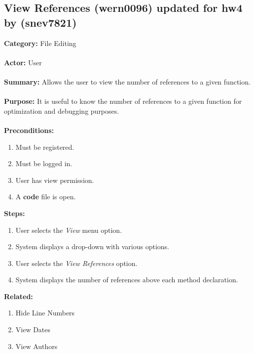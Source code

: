 \documentclass[11pt]{report}
\begin{document}
\subsection{View References (wern0096) updated for hw4 by (snev7821)}
\begin{framed}

	\textbf{Category:} File Editing \\ \\
	\textbf{Actor:} User \\ \\
	\textbf{Summary:} Allows the user to view the number of references to a given function. \\ \\
	\textbf{Purpose:} It is useful to know the number of references to a given function for optimization and debugging purposes. \\ \\
	\textbf{Preconditions:} 
	\begin{enumerate}
		\item Must be registered.
		\item Must be logged in.
		\item User has view permission.
		\item A \textbf{code} file is open.
	\end{enumerate}
	\textbf{Steps:}
	\begin{enumerate}
		\item User selects the \textit{View} menu option.
		\item System displays a drop-down with various options.
		\item User selects the \textit{View References} option.
		\item System displays the number of references above each method declaration.
	\end{enumerate}
	\textbf{Related:}
	\begin{enumerate}
		\item Hide Line Numbers
		\item View Dates
		\item View Authors
	\end{enumerate}
\end{framed}

\newpage
\end{document}
